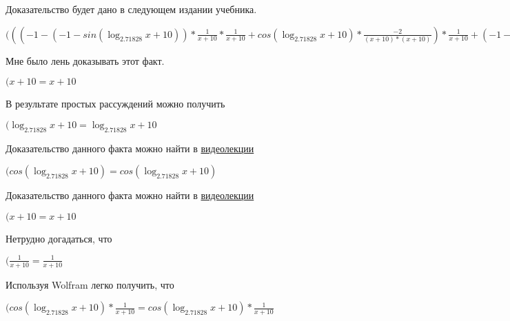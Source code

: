 \documentclass[12pt,a4paper,fleqn]{article}
\theoremstyle{definition}
\begin{document}
Доказательство будет дано в следующем издании учебника.

$((( -1  - ( -1  - sin(\log_{ 2.71828 }{ x  +  10 })) * \frac{ 1 }{ x  +  10 }
 * \frac{ 1 }{ x  +  10 }
 + cos(\log_{ 2.71828 }{ x  +  10 }) * \frac{ -2 }{( x  +  10 ) * ( x  +  10 )}
) * \frac{ 1 }{ x  +  10 }
 + ( -1  - cos(\log_{ 2.71828 }{ x  +  10 }) * \frac{ 1 }{ x  +  10 }
) * \frac{ -2 }{( x  +  10 ) * ( x  +  10 )}
 + ( -1  - cos(\log_{ 2.71828 }{ x  +  10 }) * \frac{ 1 }{ x  +  10 }
) * \frac{ -2 }{( x  +  10 ) * ( x  +  10 )}
 + ( -1  - sin(\log_{ 2.71828 }{ x  +  10 })) * \frac{ -1  -  -2  * ( x  +  10  +  x  +  10 )}{( x  +  10 ) * ( x  +  10 ) * ( x  +  10 ) * ( x  +  10 )}
) * \frac{ 1 }{ x  +  10 }
 = (( -1  - ( -1  - sin(\log_{ 2.71828 }{ x  +  10 })) * \frac{ 1 }{ x  +  10 }
 * \frac{ 1 }{ x  +  10 }
 + cos(\log_{ 2.71828 }{ x  +  10 }) * \frac{ -2 }{( x  +  10 ) * ( x  +  10 )}
) * \frac{ 1 }{ x  +  10 }
 + ( -1  - cos(\log_{ 2.71828 }{ x  +  10 }) * \frac{ 1 }{ x  +  10 }
) * \frac{ -2 }{( x  +  10 ) * ( x  +  10 )}
 + ( -1  - cos(\log_{ 2.71828 }{ x  +  10 }) * \frac{ 1 }{ x  +  10 }
) * \frac{ -2 }{( x  +  10 ) * ( x  +  10 )}
 + ( -1  - sin(\log_{ 2.71828 }{ x  +  10 })) * \frac{ -1  -  -2  * ( x  +  10  +  x  +  10 )}{( x  +  10 ) * ( x  +  10 ) * ( x  +  10 ) * ( x  +  10 )}
) * \frac{ 1 }{ x  +  10 }
$

Мне было лень доказывать этот факт.

$( x  +  10  =  x  +  10 $

В результате простых рассуждений можно получить

$(\log_{ 2.71828 }{ x  +  10 } = \log_{ 2.71828 }{ x  +  10 }$

Доказательство данного факта можно найти в \href{https://www.youtube.com/watch?v=dQw4w9WgXcQ}{видеолекции}

$(cos(\log_{ 2.71828 }{ x  +  10 }) = cos(\log_{ 2.71828 }{ x  +  10 })$

Доказательство данного факта можно найти в \href{https://www.youtube.com/watch?v=dQw4w9WgXcQ}{видеолекции}

$( x  +  10  =  x  +  10 $

Нетрудно догадаться, что

$(\frac{ 1 }{ x  +  10 }
 = \frac{ 1 }{ x  +  10 }
$

Используя Wolfram легко получить, что

$(cos(\log_{ 2.71828 }{ x  +  10 }) * \frac{ 1 }{ x  +  10 }
 = cos(\log_{ 2.71828 }{ x  +  10 }) * \frac{ 1 }{ x  +  10 }
$
\end{document}
